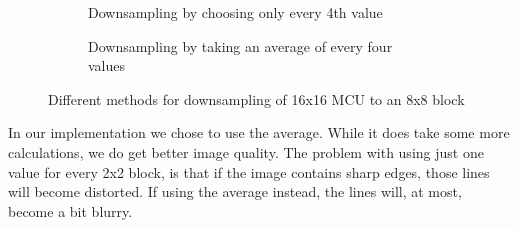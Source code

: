 \begin{figure}
    \centering
    \begin{subfigure}[b]{0.3\textwidth}
        \caption{Downsampling by choosing only every 4th value}
        \label{fig:downsampling4th}
    \end{subfigure}
    \qquad %
    \begin{subfigure}[b]{0.3\textwidth}
        \caption{Downsampling by taking an average of every four values}
        \label{fig:downsamplingAverage}
    \end{subfigure}
    \caption{Different methods for downsampling of 16x16 MCU to an 8x8 block}\label{fig:downsampling}
\end{figure}


In our implementation we chose to use the average.
While it does take some more calculations, we do get better image quality.
The problem with using just one value for every 2x2 block, is that if the image contains sharp edges, those lines will become distorted.
If using the average instead, the lines will, at most, become a bit blurry.


